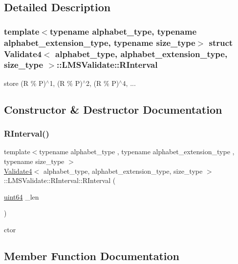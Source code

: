 \subsection{Detailed Description}
\subsubsection*{template$<$typename alphabet\+\_\+type, typename alphabet\+\_\+extension\+\_\+type, typename size\+\_\+type$>$\newline
struct Validate4$<$ alphabet\+\_\+type, alphabet\+\_\+extension\+\_\+type, size\+\_\+type $>$\+::\+L\+M\+S\+Validate\+::\+R\+Interval}

store (R \% P)$^\wedge$1, (R \% P)$^\wedge$2, (R \% P)$^\wedge$4, ... 

\subsection{Constructor \& Destructor Documentation}
\mbox{\label{struct_validate4_1_1_l_m_s_validate_1_1_r_interval_ababcb7e5df16b2bd27a8b6285ccab230}} 
\subsubsection{\texorpdfstring{R\+Interval()}{RInterval()}}
{\footnotesize\ttfamily template$<$typename alphabet\+\_\+type , typename alphabet\+\_\+extension\+\_\+type , typename size\+\_\+type $>$ \\
\hyperlink{class_validate4}{Validate4}$<$ alphabet\+\_\+type, alphabet\+\_\+extension\+\_\+type, size\+\_\+type $>$\+::L\+M\+S\+Validate\+::\+R\+Interval\+::\+R\+Interval (\begin{DoxyParamCaption}\item[{\hyperlink{types_8h_a60e8696a4678cd348e991a1f172e53f7}{uint64}}]{\+\_\+len }\end{DoxyParamCaption})\hspace{0.3cm}{\ttfamily [inline]}}



ctor 



\subsection{Member Function Documentation}
\mbox{\label{struct_validate4_1_1_l_m_s_validate_1_1_r_interval_a7c1aee0f298285e1eb0df8b3ab368036}} 
